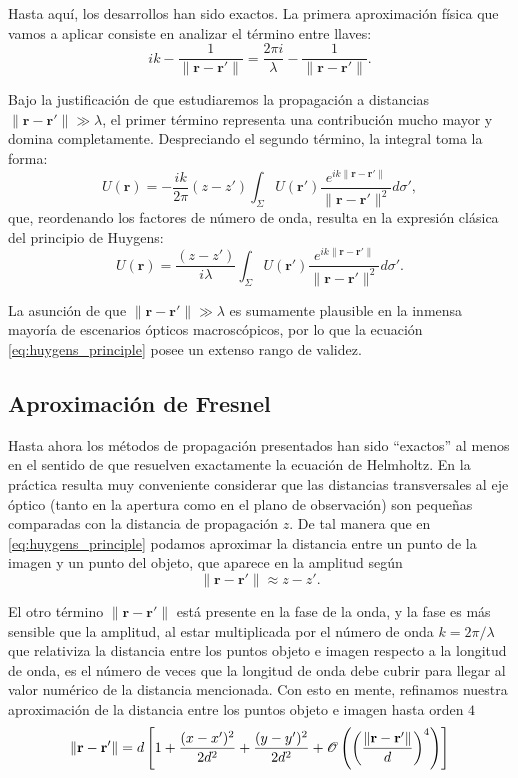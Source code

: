 Hasta aquí, los desarrollos han sido exactos. La primera aproximación física que vamos a aplicar consiste en analizar el término entre llaves:
\begin{equation}
ik - \frac{1}{\|\mathbf{r}-\mathbf{r}'\|} = \frac{2\pi i}{\lambda} - \frac{1}{\|\mathbf{r}-\mathbf{r}'\|}.
\end{equation}

Bajo la justificación de que estudiaremos la propagación a distancias $\|\mathbf{r}-\mathbf{r}'\| \gg \lambda$, el primer término representa una contribución mucho mayor y domina completamente. Despreciando el segundo término, la integral toma la forma:
\begin{equation}
U(\mathbf{r}) = -\frac{ik}{2\pi} (z-z') \int_{\Sigma} U(\mathbf{r}') \frac{e^{ik\|\mathbf{r}-\mathbf{r}'\|}}{\|\mathbf{r}-\mathbf{r}'\|^2} d\sigma',
\end{equation}
que, reordenando los factores de número de onda, resulta en la expresión clásica del principio de Huygens:
\begin{equation}
U(\mathbf{r}) = \frac{(z-z')}{i\lambda} \int_{\Sigma} U(\mathbf{r}') \frac{e^{ik\|\mathbf{r}-\mathbf{r}'\|}}{\|\mathbf{r}-\mathbf{r}'\|^2} d\sigma'.
\label{eq:huygens_principle}
\end{equation}

La asunción de que $\|\mathbf{r}-\mathbf{r}'\| \gg \lambda$ es sumamente plausible en la inmensa mayoría de escenarios ópticos macroscópicos, por lo que la ecuación \eqref{eq:huygens_principle} posee un extenso rango de validez.


\subsection{Aproximación de Fresnel}

Hasta ahora los métodos de propagación presentados han sido ``exactos'' al menos en el sentido de que resuelven exactamente la ecuación de Helmholtz.
En la práctica resulta muy conveniente considerar que las distancias transversales al eje óptico (tanto en la apertura como en el plano de observación) son pequeñas comparadas con la distancia de propagación $z$.
De tal manera que en \eqref{eq:huygens_principle} podamos aproximar la distancia entre un punto de la imagen y un punto del objeto, que aparece en la amplitud según
\begin{equation}
\|\mathbf{r}-\mathbf{r}'\| \approx z-z'.
\end{equation}

El otro término $\|\mathbf{r}-\mathbf{r}'\|$ está presente en la fase de la onda, y la fase es más sensible que la amplitud, al estar multiplicada por el número de onda $k = 2\pi/\lambda$ que relativiza la distancia entre los puntos objeto e imagen respecto a la longitud de onda, es el número de veces que la longitud de onda debe cubrir para llegar al valor numérico de la distancia mencionada.
Con esto en mente, refinamos nuestra aproximación de la distancia entre los puntos objeto e imagen hasta orden $4$
$$\|\mathbf{r}-\mathbf{r}'\| = d \left[ 1 + \frac{(x-x')^2}{2d^2} + \frac{(y-y')^2}{2d^2} + \mathscr O\left( \left( \frac{\| \vb r - \vb r' \|}{d}\right)^4 \right) \right]$$

